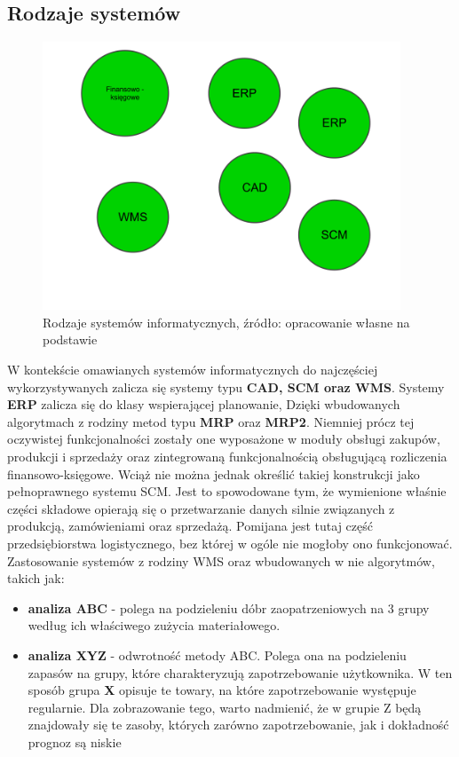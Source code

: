 	\subsection{Rodzaje systemów}
		\begin{figure}[h]
			\begin{center}
				\includegraphics[width=0.95\textwidth]{images/is_logistic}
			\end{center}
			\caption[Rodzaje systemów informatycznych]{
				Rodzaje systemów informatycznych, źródło: opracowanie własne na podstawie \cite{IDL}
			}
		\end{figure}
		W kontekście omawianych systemów informatycznych do najczęściej wykorzystywanych zalicza się systemy typu
		\textbf{CAD, SCM oraz WMS}. Systemy \textbf{ERP} zalicza się do klasy wspierającej planowanie, Dzięki 
		wbudowanych algorytmach z rodziny metod typu \textbf{MRP} oraz \textbf{MRP2}. Niemniej prócz tej oczywistej
		funkcjonalności zostały one wyposażone w moduły obsługi zakupów, produkcji i sprzedaży oraz zintegrowaną
		funkcjonalnością obsługującą rozliczenia finansowo-księgowe. Wciąż nie można jednak określić takiej
		konstrukcji jako pełnoprawnego systemu SCM. Jest to spowodowane tym, że wymienione właśnie części składowe
		opierają się o przetwarzanie danych silnie związanych z produkcją, zamówieniami oraz sprzedażą. Pomijana 
		jest tutaj część przedsiębiorstwa logistycznego, bez której w ogóle nie mogłoby ono funkcjonować.
		Zastosowanie systemów z rodziny WMS oraz wbudowanych w nie algorytmów, takich jak:
		\begin{itemize}
			\item \textbf{analiza ABC} - polega na podzieleniu dóbr zaopatrzeniowych na 3 grupy według ich właściwego zużycia materiałowego.
			\item \textbf{analiza XYZ} - odwrotność metody ABC. Polega ona na podzieleniu zapasów na grupy, które charakteryzują
			zapotrzebowanie użytkownika. W ten sposób grupa \textbf{X} opisuje te towary, na które zapotrzebowanie występuje regularnie.
			Dla zobrazowanie tego, warto nadmienić, że w grupie Z będą znajdowały się te zasoby, których zarówno zapotrzebowanie, 
			jak i dokładność prognoz są niskie 
		\end{itemize}
		
